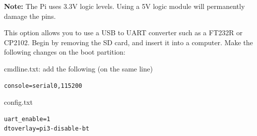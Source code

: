 \textbf{Note:} The Pi uses 3.3V logic levels. Using a 5V logic module will permanently damage the pins.

This option allows you to use a USB to UART converter such as a FT232R or CP2102.
Begin by removing the SD card, and insert it into a computer. Make the following changes on the boot partition:

cmdline.txt: add the following (on the same line)
\begin{lstlisting}
console=serial0,115200 
\end{lstlisting}

config.txt
\begin{lstlisting}
uart_enable=1
dtoverlay=pi3-disable-bt
\end{lstlisting}
